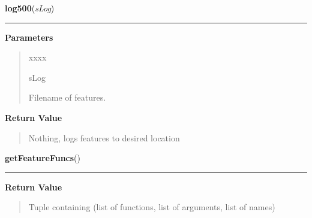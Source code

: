     \label{QSTK:qstkfeat:featutil:log500}

    \vspace{0.5ex}

\hspace{.8\funcindent}\begin{boxedminipage}{\funcwidth}

    \raggedright \textbf{log500}(\textit{sLog})

    \vspace{-1.5ex}

    \rule{\textwidth}{0.5\fboxrule}
\setlength{\parskip}{2ex}
\setlength{\parskip}{1ex}
      \textbf{Parameters}
      \vspace{-1ex}

      \begin{quote}
        \begin{Ventry}{xxxx}

          \item[sLog]

          Filename of features.

        \end{Ventry}

      \end{quote}

      \textbf{Return Value}
    \vspace{-1ex}

      \begin{quote}
      Nothing, logs features to desired location

      \end{quote}

    \end{boxedminipage}

    \label{QSTK:qstkfeat:featutil:getFeatureFuncs}

    \vspace{0.5ex}

\hspace{.8\funcindent}\begin{boxedminipage}{\funcwidth}

    \raggedright \textbf{getFeatureFuncs}()

    \vspace{-1.5ex}

    \rule{\textwidth}{0.5\fboxrule}
\setlength{\parskip}{2ex}
\setlength{\parskip}{1ex}
      \textbf{Return Value}
    \vspace{-1ex}

      \begin{quote}
      Tuple containing (list of functions, list of arguments, list of 
      names)

      \end{quote}

    \end{boxedminipage}

